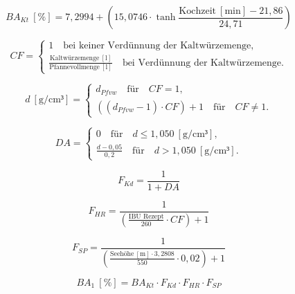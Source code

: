 \documentclass[a4paper,parskip=half]{scrartcl}
\newcommand{\BA}{\mathit{BA}}
\newcommand{\BAKt}{{\mathit{BA}}_{\mathit{Kt}}}
\newcommand{\umin}{\:[\textrm{min}]}
\newcommand{\uden}{\:[\text{g/cm³}]}
\newcommand{\uper}{\:[\text{\%}]}
\newcommand{\uli}{\:[\text{l}]}
\newcommand{\ume}{\:[\text{m}]}
\newcommand{\FKd}{F_{\mathit{Kd}}}
\newcommand{\FHR}{F_{\mathit{HR}}}
\newcommand{\FSP}{F_{\mathit{SP}}}
\newcommand{\dPfvw}{d_\mathit{Pfvw}}
\begin{document}
\begin{equation}
\BAKt \uper = 7,2994 + \left(15,0746 \cdot \tanh{\frac{\text{Kochzeit} \umin - 21,86}{24,71}}\right)
\label{eq:garetzbakt}
\end{equation}


\begin{equation}
\mathit{CF} = \begin{cases}
1 \quad \text{bei keiner Verdünnung der Kaltwürzemenge}, \\
\frac{\text{Kaltwürzemenge} \uli}{\text{Pfannevollmenge} \uli} \quad \text{bei Verdünnung der Kaltwürzemenge}.
\end{cases}
\label{eq:garetzcf}
\end{equation}

\begin{equation}
d \uden = \begin{cases}
\dPfvw \quad \text{für} \quad \mathit{CF} = 1, \\
\left( \left( \dPfvw - 1 \right) \cdot \mathit{CF} \right) + 1 \quad \text{für} \quad \mathit{CF} \ne 1.
\end{cases}
\label{eq:garetzbg}
\end{equation}

\begin{equation}
\mathit{DA} = \begin{cases}
0 \quad \text{für} \quad d \le 1,050 \uden, \\
\frac{d - 0,05}{0,2} \quad \text{für} \quad d > 1,050 \uden.
\end{cases}
\label{eq:garetzga}
\end{equation}

\begin{equation}
\FKd = \frac{1}{1 + DA}
\label{eq:garetzkd}
\end{equation}

\begin{equation}
\FHR = \frac{1}{\left( \frac{\text{IBU Rezept}}{260} \cdot \mathit{CF} \right) + 1}
\label{eq:garetzhr}
\end{equation}

\begin{equation}
\FSP = \frac{1}{\left(\frac{\text{Seehöhe} \ume \cdot 3,2808}{550} \cdot 0,02 \right) + 1}
\label{eq:garetzsp}
\end{equation}

\begin{equation}
\BA_1 \uper = \BAKt \cdot \FKd \cdot \FHR \cdot \FSP
\label{eq:garetzba1}
\end{equation}
\end{document}
